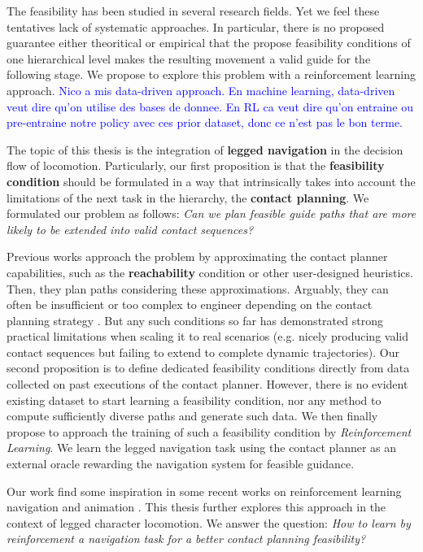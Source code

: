 The feasibility has been studied in several research fields. Yet we feel these tentatives lack of systematic approaches.
In particular, there is no proposed guarantee either theoritical or empirical that the propose feasibility conditions of one hierarchical level makes the resulting movement a valid guide for the following stage.
We propose to explore this problem with a reinforcement learning approach.
\textcolor{blue}{Nico a mis data-driven approach. En machine learning, data-driven veut dire qu'on utilise des bases de donnee. En RL ca veut dire qu'on entraine ou pre-entraine notre policy avec ces prior dataset, donc ce n'est pas le bon terme.}
\hfill \break
\hfill \break

The topic of this thesis is the integration of \textbf{legged navigation} in the decision flow of locomotion. Particularly, our first proposition is that the \textbf{feasibility condition} should be formulated in a way that intrinsically takes into account the limitations of the next task in the hierarchy, the \textbf{contact planning}.
We formulated our problem as follows: \textit{Can we plan feasible guide paths that are more likely to be extended into valid contact sequences?}

Previous works approach the problem by approximating the contact planner capabilities, such as the \textbf{reachability} condition \cite{RB-PRM} or other user-designed heuristics.
Then, they plan paths considering these approximations.
Arguably, they can often be insufficient or too complex to engineer depending on the contact planning strategy \cite{AcyclicCP, winkler_2014}.
But any such conditions so far has demonstrated strong practical limitations when scaling it to real scenarios (e.g. nicely producing valid contact sequences but failing to extend to complete dynamic trajectories). 
Our second proposition is to define dedicated feasibility conditions directly from data collected on past executions of the contact planner.
However, there is no evident existing dataset to start learning a feasibility condition, nor any method to compute sufficiently diverse paths and generate such data.
We then finally propose to approach the training of such a feasibility condition by \textit{Reinforcement Learning}. We learn the legged navigation task using the contact planner as an external oracle rewarding the navigation system for feasible guidance.

Our work find some inspiration in some recent works on reinforcement learning navigation and animation \cite{prm_rl_2019, deepLoco}. 
This thesis further explores this approach in the context of legged character locomotion.
We answer the question: \textit{How to learn by reinforcement a navigation task for a better contact planning feasibility?}

